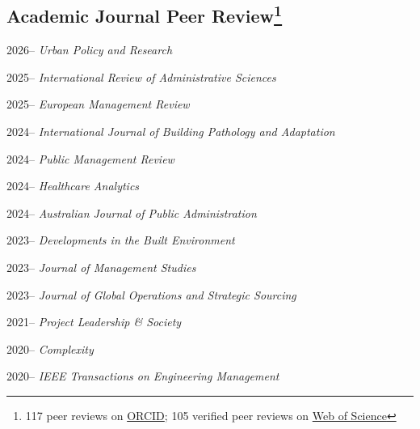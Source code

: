 \documentclass[11pt,a4paper]{report} %
\begin{document}
  \subsection*{Academic Journal Peer Review\footnote{117 peer reviews on \href{https://orcid.org/0000-0003-3426-703X}{ORCID}; 105 verified peer reviews on \href{https://www.webofscience.com/wos/author/record/C-6071-2014}{Web of Science}}}

    \begin{tablist}
    
        \item[2026--] \tab{}\textit{Urban Policy and Research}

        \item[2025--] \tab{}\textit{International Review of Administrative Sciences}
        
        \item[2025--] \tab{}\textit{European Management Review}
        
        \item[2024--] \tab{}\textit{International Journal of Building Pathology and Adaptation}
        
        \item[2024--] \tab{}\textit{Public Management Review}
        
        \item[2024--] \tab{}\textit{Healthcare Analytics}
        
        \item[2024--] \tab{}\textit{Australian Journal of Public Administration}
        
        \item[2023--] \tab{}\textit{Developments in the Built Environment}
        
        \item[2023--] \tab{}\textit{Journal of Management Studies}
        
        \item[2023--] \tab{}\textit{Journal of Global Operations and Strategic Sourcing}
        
        \item[2021--] \tab{}\textit{Project Leadership \& Society}
        
        \item[2020--] \tab{}\textit{Complexity}
        
        \item[2020--] \tab{}\textit{IEEE Transactions on Engineering Management}
        

\end{tablist}
\end{document}
